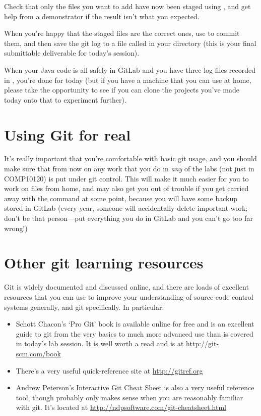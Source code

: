 Check that only the files you want to add have now been staged using , and get help from a demonstrator if the result isn't what you expected.

When you're happy that the staged files are the correct ones, use  to commit them, and then save the git log to a file called  in your  directory (this is your final submittable deliverable for today's session). 

When your Java code is all safely in GitLab and you have three log files recorded in , you're done for today (but if you have a machine that you can use at home, please take the opportunity to see if you can clone the projects you've made today onto that to experiment further). 


\section{Using Git for real}

It's really important that you're comfortable with basic git usage, and you should make sure that from now on any work that you do in \emph{any} of the labs (not just in COMP10120) is put under git control. This will make it much easier for you to work on files from home, and may also get you out of trouble if you get carried away with the  command at some point, because you will have some backup stored in GitLab (every year, someone will accidentally delete important work; don't be that person---put everything you do in GitLab and you can't go too far wrong!)

\section{Other git learning resources}

Git is widely documented and discussed online, and there are loads of excellent resources that you can use to improve your understanding of  source code control systems generally, and git specifically. In particular:

\begin{itemize}

\item Schott Chacon's `Pro Git' book is available online for free and is an excellent guide to git from the very basics to much more advanced use than is covered in today's lab session. It is well worth a read and is at \url{http://git-scm.com/book}

\item There's a very useful quick-reference site at \url{http://gitref.org}

\item Andrew Peterson's Interactive Git Cheat Sheet is also a very useful reference tool, though probably only makes sense when you are reasonably familiar with git. It's located at \url{http://ndpsoftware.com/git-cheatsheet.html}
\end{itemize}


